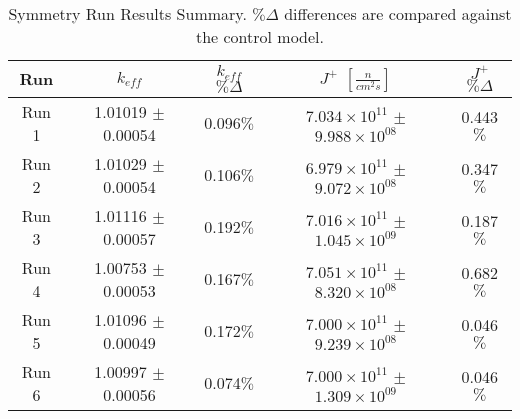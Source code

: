 
\begin{table}[H]
\centering
 \begin{tabularx}{0.7\textwidth}{c  c  c  c  c}
 	\hline
 	Run & $k_{eff}$ & $k_{eff}$ $\% \Delta$ & $J^+$  $[\frac{n}{cm^2s}]$ & $J^+$ $\% \Delta$  \\
 	\hline
 	Run 1 & 1.01019 $\pm$ 0.00054 & 0.096$\%$ & $7.034\times10^{11}$ $\pm$ $9.988\times10^{08}$ & 0.443$\%$ \\
 	Run 2 & 1.01029 $\pm$ 0.00054 & 0.106$\%$ & $6.979\times10^{11}$ $\pm$ $9.072\times10^{08}$ & 0.347$\%$ \\
 	Run 3 & 1.01116 $\pm$ 0.00057 & 0.192$\%$ & $7.016\times10^{11}$ $\pm$ $1.045\times10^{09}$ & 0.187$\%$ \\
 	Run 4 & 1.00753 $\pm$ 0.00053 & 0.167$\%$ & $7.051\times10^{11}$ $\pm$ $8.320\times10^{08}$ & 0.682$\%$ \\
 	Run 5 & 1.01096 $\pm$ 0.00049 & 0.172$\%$ & $7.000\times10^{11}$ $\pm$ $9.239\times10^{08}$ & 0.046$\%$ \\
 	Run 6 & 1.00997 $\pm$ 0.00056 & 0.074$\%$ & $7.000\times10^{11}$ $\pm$ $1.309\times10^{09}$ & 0.046$\%$ \\
 	\hline

 \end{tabularx}
 \caption[Symmetry Run Results Summary]{Symmetry Run Results Summary.  $\%\Delta$ differences are compared against the control model.}
\label{table:slicesens}
\end{table}